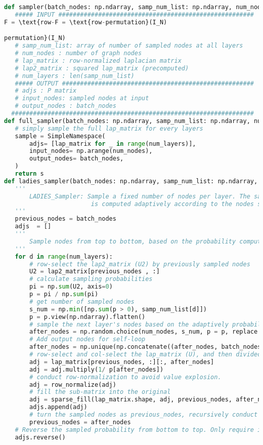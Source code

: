 \begin{lstlisting}[language=Python, caption= LADIES code, label=ls:ladies_code]
def sampler(batch_nodes: np.ndarray, samp_num_list: np.ndarray, num_nodes: int, lap_matrix: sparse.csr_matrix, lap2_matrix: sparse.csr_matrix, num_layers: int) -> SimpleNamespace:
   ##### INPUT ######################################################
F = \text{row-F = \text{row-permutation}(I_N)

permutation}(I_N)
   # samp_num_list: array of number of sampled nodes at all layers
   # num_nodes : number of graph nodes
   # lap_matrix : row-normalized laplacian matrix
   # lap2_matrix : squared lap_matrix (precomputed)
   # num_layers : len(samp_num_list)
   ##### OUTPUT #####################################################
   # adjs : P matrix
   # input_nodes: sampled nodes at input
   # output_nodes : batch_nodes
  ###################################################################
def full_sampler(batch_nodes: np.ndarray, samp_num_list: np.ndarray, num_nodes: int, lap_matrix: sparse.csr_matrix, lap2_matrix: sparse.csr_matrix, num_layers: int) -> SimpleNamespace:
   # simply sample the full lap_matrix for every layers
   sample = SimpleNamespace(
       adjs= [lap_matrix for _ in range(num_layers)],
       input_nodes= np.arange(num_nodes),
       output_nodes= batch_nodes,
   )
   return s
def ladies_sampler(batch_nodes: np.ndarray, samp_num_list: np.ndarray, num_nodes: int, lap_matrix: sparse.csr_matrix, lap2_matrix: sparse.csr_matrix, num_layers: int) -> SimpleNamespace:
   '''
       LADIES_Sampler: Sample a fixed number of nodes per layer. The sampling probability (importance)
                        is computed adaptively according to the nodes sampled in the upper layer.
   '''
   previous_nodes = batch_nodes
   adjs  = []
   '''
       Sample nodes from top to bottom, based on the probability computed adaptively (layer-dependent).
   '''
   for d in range(num_layers):
       # row-select the lap2_matrix (U2) by previously sampled nodes
       U2 = lap2_matrix[previous_nodes , :]
       # calculate sampling probabilities
       pi = np.sum(U2, axis=0)
       p = pi / np.sum(pi)
       # get number of sampled nodes
       s_num = np.min([np.sum(p > 0), samp_num_list[d]])
       p = p.view(np.ndarray).flatten()
       # sample the next layer's nodes based on the adaptively probability (p).
       after_nodes = np.random.choice(num_nodes, s_num, p = p, replace = False)
       # Add output nodes for self-loop
       after_nodes = np.unique(np.concatenate((after_nodes, batch_nodes)))
       # row-select and col-select the lap_matrix (U), and then divided by the sampled probability for unbiased-sampling.
       adj = lap_matrix[previous_nodes, :][:, after_nodes]
       adj = adj.multiply(1/ p[after_nodes])
       # conduct row-normalization to avoid value explosion.     
       adj = row_normalize(adj)
       # fill the sub-matrix into the original
       adj = sparse_fill(lap_matrix.shape, adj, previous_nodes, after_nodes)
       adjs.append(adj)
       # turn the sampled nodes as previous_nodes, recursively conduct sampling.
       previous_nodes = after_nodes
   # Reverse the sampled probability from bottom to top. Only require input how the lastly sampled nodes.
   adjs.reverse()
 

\end{lstlisting}
